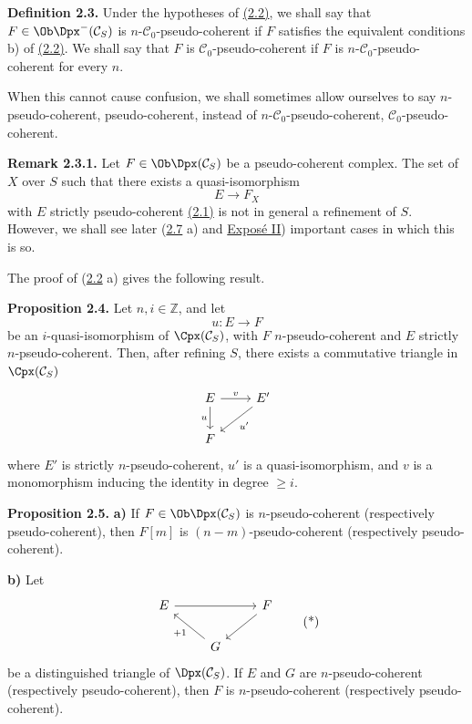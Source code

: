 \textbf{Definition 2.3.} Under the hypotheses of \hyperlink{sga6.e01.prop.2-2}{(2.2)}, we shall say that \(F\in\Ob\Dpx^-(\mathcal C_S)\) is \(n\)-\(\mathcal C_0\)-pseudo-coherent if \(F\) satisfies the equivalent conditions b) of \hyperlink{sga6.e01.prop.2-2}{(2.2)}. We shall say that \(F\) is \(\mathcal C_0\)-pseudo-coherent if \(F\) is \(n\)-\(\mathcal C_0\)-pseudo-coherent for every \(n\).

When this cannot cause confusion, we shall sometimes allow ourselves to say \(n\)-pseudo-coherent, pseudo-coherent, instead of \(n\)-\(\mathcal C_0\)-pseudo-coherent, \(\mathcal C_0\)-pseudo-coherent.

\textbf{Remark 2.3.1.} Let \(F\in\Ob\Dpx(\mathcal C_S)\) be a pseudo-coherent complex. The set of \(X\) over \(S\) such that there exists a quasi-isomorphism
\[
  E\longrightarrow F_X
\]
with \(E\) strictly pseudo-coherent \hyperlink{sga6.e01.def.2-1}{(2.1)} is not in general a refinement of \(S\). However, we shall see later (\hyperlink{sga6.e01.prop.2-7}{2.7} a) and \hyperlink{sga6.e02.expose}{Exposé II}) important cases in which this is so.

The proof of (\hyperlink{sga6.e01.prop.2-2}{2.2} a) gives the following result.

\textbf{Proposition 2.4.} Let \(n,i\in\mathbb Z\), and let
\[
  u:E\longrightarrow F
\]
be an \(i\)-quasi-isomorphism of \(\Cpx(\mathcal C_S)\), with \(F\) \(n\)-pseudo-coherent and \(E\) strictly \(n\)-pseudo-coherent. Then, after refining \(S\), there exists a commutative triangle in \(\Cpx(\mathcal C_S)\)
\[
\begin{tikzcd}
E \arrow[r,"v"] \arrow[d,"u"'] & E' \arrow[dl,"u'"]\\
F &
\end{tikzcd}
\]
where \(E'\) is strictly \(n\)-pseudo-coherent, \(u'\) is a quasi-isomorphism, and \(v\) is a monomorphism inducing the identity in degree \(\geq i\).

\textbf{Proposition 2.5.} \textbf{a)} If \(F\in\Ob\Dpx(\mathcal C_S)\) is \(n\)-pseudo-coherent (respectively pseudo-coherent), then \(F[m]\) is \((n-m)\)-pseudo-coherent (respectively pseudo-coherent).

\textbf{b)} Let
\[
\begin{tikzcd}
E \arrow[rr] && F \arrow[dl]\\
& G \arrow[ul,"+1"] &
\end{tikzcd}
\tag{*}
\]
be a distinguished triangle of \(\Dpx(\mathcal C_S)\). If \(E\) and \(G\) are \(n\)-pseudo-coherent (respectively pseudo-coherent), then \(F\) is \(n\)-pseudo-coherent (respectively pseudo-coherent).

